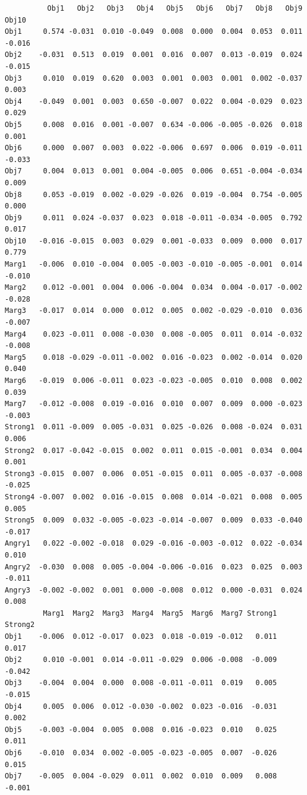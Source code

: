 \documentclass[
  english,
]{book}
\begin{document}
\begin{verbatim}
          Obj1   Obj2   Obj3   Obj4   Obj5   Obj6   Obj7   Obj8   Obj9  Obj10
Obj1     0.574 -0.031  0.010 -0.049  0.008  0.000  0.004  0.053  0.011 -0.016
Obj2    -0.031  0.513  0.019  0.001  0.016  0.007  0.013 -0.019  0.024 -0.015
Obj3     0.010  0.019  0.620  0.003  0.001  0.003  0.001  0.002 -0.037  0.003
Obj4    -0.049  0.001  0.003  0.650 -0.007  0.022  0.004 -0.029  0.023  0.029
Obj5     0.008  0.016  0.001 -0.007  0.634 -0.006 -0.005 -0.026  0.018  0.001
Obj6     0.000  0.007  0.003  0.022 -0.006  0.697  0.006  0.019 -0.011 -0.033
Obj7     0.004  0.013  0.001  0.004 -0.005  0.006  0.651 -0.004 -0.034  0.009
Obj8     0.053 -0.019  0.002 -0.029 -0.026  0.019 -0.004  0.754 -0.005  0.000
Obj9     0.011  0.024 -0.037  0.023  0.018 -0.011 -0.034 -0.005  0.792  0.017
Obj10   -0.016 -0.015  0.003  0.029  0.001 -0.033  0.009  0.000  0.017  0.779
Marg1   -0.006  0.010 -0.004  0.005 -0.003 -0.010 -0.005 -0.001  0.014 -0.010
Marg2    0.012 -0.001  0.004  0.006 -0.004  0.034  0.004 -0.017 -0.002 -0.028
Marg3   -0.017  0.014  0.000  0.012  0.005  0.002 -0.029 -0.010  0.036 -0.007
Marg4    0.023 -0.011  0.008 -0.030  0.008 -0.005  0.011  0.014 -0.032 -0.008
Marg5    0.018 -0.029 -0.011 -0.002  0.016 -0.023  0.002 -0.014  0.020  0.040
Marg6   -0.019  0.006 -0.011  0.023 -0.023 -0.005  0.010  0.008  0.002  0.039
Marg7   -0.012 -0.008  0.019 -0.016  0.010  0.007  0.009  0.000 -0.023 -0.003
Strong1  0.011 -0.009  0.005 -0.031  0.025 -0.026  0.008 -0.024  0.031  0.006
Strong2  0.017 -0.042 -0.015  0.002  0.011  0.015 -0.001  0.034  0.004  0.001
Strong3 -0.015  0.007  0.006  0.051 -0.015  0.011  0.005 -0.037 -0.008 -0.025
Strong4 -0.007  0.002  0.016 -0.015  0.008  0.014 -0.021  0.008  0.005  0.005
Strong5  0.009  0.032 -0.005 -0.023 -0.014 -0.007  0.009  0.033 -0.040 -0.017
Angry1   0.022 -0.002 -0.018  0.029 -0.016 -0.003 -0.012  0.022 -0.034  0.010
Angry2  -0.030  0.008  0.005 -0.004 -0.006 -0.016  0.023  0.025  0.003 -0.011
Angry3  -0.002 -0.002  0.001  0.000 -0.008  0.012  0.000 -0.031  0.024  0.008
         Marg1  Marg2  Marg3  Marg4  Marg5  Marg6  Marg7 Strong1 Strong2
Obj1    -0.006  0.012 -0.017  0.023  0.018 -0.019 -0.012   0.011   0.017
Obj2     0.010 -0.001  0.014 -0.011 -0.029  0.006 -0.008  -0.009  -0.042
Obj3    -0.004  0.004  0.000  0.008 -0.011 -0.011  0.019   0.005  -0.015
Obj4     0.005  0.006  0.012 -0.030 -0.002  0.023 -0.016  -0.031   0.002
Obj5    -0.003 -0.004  0.005  0.008  0.016 -0.023  0.010   0.025   0.011
Obj6    -0.010  0.034  0.002 -0.005 -0.023 -0.005  0.007  -0.026   0.015
Obj7    -0.005  0.004 -0.029  0.011  0.002  0.010  0.009   0.008  -0.001

\end{verbatim}
\end{document}
